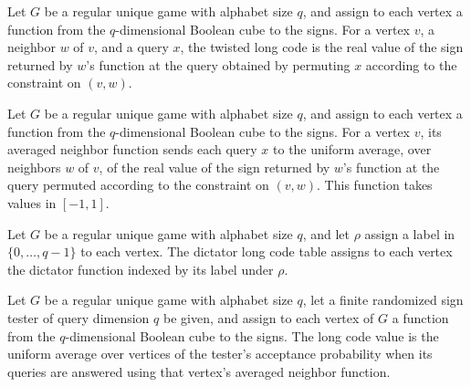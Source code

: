 \begin{definition}
\label{FABL.RegularUniqueGame.twistedLongCode}
\leanok
{}
Let $G$ be a regular unique game with alphabet size $q$, and assign to each vertex a
function from the $q$-dimensional Boolean cube to the signs. For a vertex $v$, a
neighbor $w$ of $v$, and a query $x$, the twisted long code is the real value of the
sign returned by $w$'s function at the query obtained by permuting $x$ according to the
constraint on $(v,w)$.
\end{definition}

\begin{definition}
\label{FABL.RegularUniqueGame.averagedNeighborFunction}
\leanok
{}
Let $G$ be a regular unique game with alphabet size $q$, and assign to each vertex a
function from the $q$-dimensional Boolean cube to the signs. For a vertex $v$, its
averaged neighbor function sends each query $x$ to the uniform average, over neighbors
$w$ of $v$, of the real value of the sign returned by $w$'s function at the query
permuted according to the constraint on $(v,w)$. This function takes values in $[-1,1]$.
\end{definition}

\begin{definition}
\label{FABL.RegularUniqueGame.dictatorLongCode}
\leanok
{}
Let $G$ be a regular unique game with alphabet size $q$, and let $\rho$ assign a label in
$\{0,\ldots,q-1\}$ to each vertex. The dictator long code table assigns to each
vertex the dictator function indexed by its label under $\rho$.
\end{definition}

\begin{definition}
\label{FABL.RegularUniqueGame.longCodeValue}
\leanok
{}
Let $G$ be a regular unique game with alphabet size $q$, let a finite randomized sign
tester of query dimension $q$ be given, and assign to each vertex of $G$ a function from
the $q$-dimensional Boolean cube to the signs. The long code value is the uniform
average over vertices of the tester's acceptance probability when its queries are
answered using that vertex's averaged neighbor function.
\end{definition}

